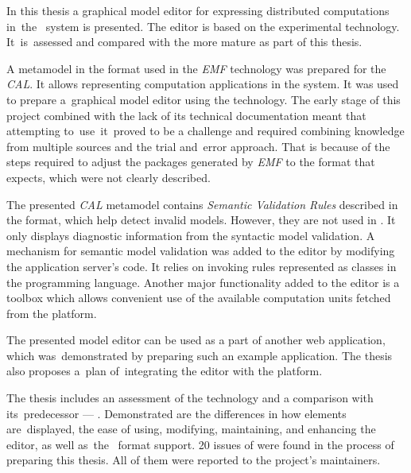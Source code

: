 {
In this thesis a graphical model editor for expressing distributed
computations in~the~\BalticLSC{} system is presented. The editor is based on
the experimental \SiriusWeb{} technology. It~is~assessed and
compared with the more mature \SiriusDesktop{} as part of this thesis.

A metamodel in the \Ecore{} format used in the \emph{\acrfull{EMF}}
technology was prepared for the \emph{\acrfull{CAL}}. It allows
representing computation applications in the \BalticLSC{} system. It was
used to prepare a~graphical model editor using the \SiriusWeb{} technology. The
early stage of
this project combined with the lack of its technical documentation meant
that attempting to~use~it~proved to be a challenge and required combining
knowledge from multiple sources and the trial and~error approach. That is
because of the steps required to adjust the
\Java{} packages generated by \emph{\acrshort{EMF}} to the format that
\SiriusWeb{} expects, which were not clearly described.

The presented \emph{\acrshort{CAL}} metamodel contains \emph{Semantic
	Validation Rules} described in the \Ecore{} format, which help detect
invalid
models. However, they are not used in \SiriusWeb{}. It only displays diagnostic
information from the syntactic model validation. A mechanism for semantic model
validation was added to the editor by modifying the application server's code.
It relies on invoking rules represented as classes in the \Java{} programming
language. Another major functionality added to the editor is a toolbox which
allows convenient use of the available computation units fetched from the
\BalticLSC{} platform.

The presented model editor can be used as a part of another web application,
which was~demonstrated by preparing such an example application. The thesis
also proposes a~plan of~integrating the editor with the \BalticLSC{}
platform.

The thesis includes an assessment of the \SiriusWeb{} technology and a
comparison with its~predecessor --- \SiriusDesktop{}. Demonstrated are the
differences in how elements are~displayed, the ease of using, modifying,
maintaining, and enhancing the editor, as well as~the~\Ecore{} format support.
20 issues of \SiriusWeb{} were found in the process of preparing this
thesis. All of them were reported to the project's maintainers.
}

